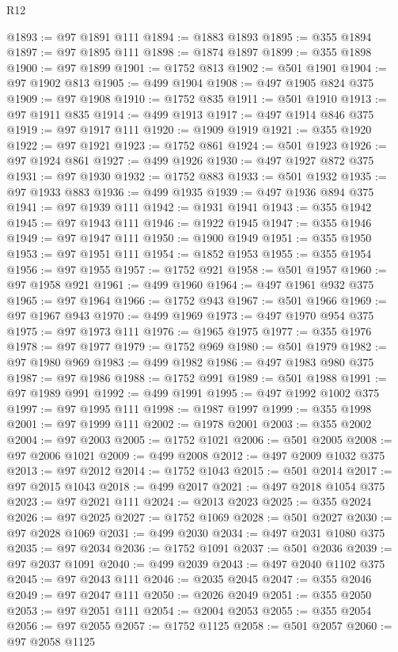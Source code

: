 \begin{lexlean}{R12}
\begin{coremodule}
@1893 := @97 @1891 @111
@1894 := @1883 @1893
@1895 := @355 @1894
@1897 := @97 @1895 @111
@1898 := @1874 @1897
@1899 := @355 @1898
@1900 := @97 @1899
@1901 := @1752 @813
@1902 := @501 @1901
@1904 := @97 @1902 @813
@1905 := @499 @1904
@1908 := @497 @1905 @824 @375
@1909 := @97 @1908
@1910 := @1752 @835
@1911 := @501 @1910
@1913 := @97 @1911 @835
@1914 := @499 @1913
@1917 := @497 @1914 @846 @375
@1919 := @97 @1917 @111
@1920 := @1909 @1919
@1921 := @355 @1920
@1922 := @97 @1921
@1923 := @1752 @861
@1924 := @501 @1923
@1926 := @97 @1924 @861
@1927 := @499 @1926
@1930 := @497 @1927 @872 @375
@1931 := @97 @1930
@1932 := @1752 @883
@1933 := @501 @1932
@1935 := @97 @1933 @883
@1936 := @499 @1935
@1939 := @497 @1936 @894 @375
@1941 := @97 @1939 @111
@1942 := @1931 @1941
@1943 := @355 @1942
@1945 := @97 @1943 @111
@1946 := @1922 @1945
@1947 := @355 @1946
@1949 := @97 @1947 @111
@1950 := @1900 @1949
@1951 := @355 @1950
@1953 := @97 @1951 @111
@1954 := @1852 @1953
@1955 := @355 @1954
@1956 := @97 @1955
@1957 := @1752 @921
@1958 := @501 @1957
@1960 := @97 @1958 @921
@1961 := @499 @1960
@1964 := @497 @1961 @932 @375
@1965 := @97 @1964
@1966 := @1752 @943
@1967 := @501 @1966
@1969 := @97 @1967 @943
@1970 := @499 @1969
@1973 := @497 @1970 @954 @375
@1975 := @97 @1973 @111
@1976 := @1965 @1975
@1977 := @355 @1976
@1978 := @97 @1977
@1979 := @1752 @969
@1980 := @501 @1979
@1982 := @97 @1980 @969
@1983 := @499 @1982
@1986 := @497 @1983 @980 @375
@1987 := @97 @1986
@1988 := @1752 @991
@1989 := @501 @1988
@1991 := @97 @1989 @991
@1992 := @499 @1991
@1995 := @497 @1992 @1002 @375
@1997 := @97 @1995 @111
@1998 := @1987 @1997
@1999 := @355 @1998
@2001 := @97 @1999 @111
@2002 := @1978 @2001
@2003 := @355 @2002
@2004 := @97 @2003
@2005 := @1752 @1021
@2006 := @501 @2005
@2008 := @97 @2006 @1021
@2009 := @499 @2008
@2012 := @497 @2009 @1032 @375
@2013 := @97 @2012
@2014 := @1752 @1043
@2015 := @501 @2014
@2017 := @97 @2015 @1043
@2018 := @499 @2017
@2021 := @497 @2018 @1054 @375
@2023 := @97 @2021 @111
@2024 := @2013 @2023
@2025 := @355 @2024
@2026 := @97 @2025
@2027 := @1752 @1069
@2028 := @501 @2027
@2030 := @97 @2028 @1069
@2031 := @499 @2030
@2034 := @497 @2031 @1080 @375
@2035 := @97 @2034
@2036 := @1752 @1091
@2037 := @501 @2036
@2039 := @97 @2037 @1091
@2040 := @499 @2039
@2043 := @497 @2040 @1102 @375
@2045 := @97 @2043 @111
@2046 := @2035 @2045
@2047 := @355 @2046
@2049 := @97 @2047 @111
@2050 := @2026 @2049
@2051 := @355 @2050
@2053 := @97 @2051 @111
@2054 := @2004 @2053
@2055 := @355 @2054
@2056 := @97 @2055
@2057 := @1752 @1125
@2058 := @501 @2057
@2060 := @97 @2058 @1125

\end{coremodule}
\end{lexlean}
